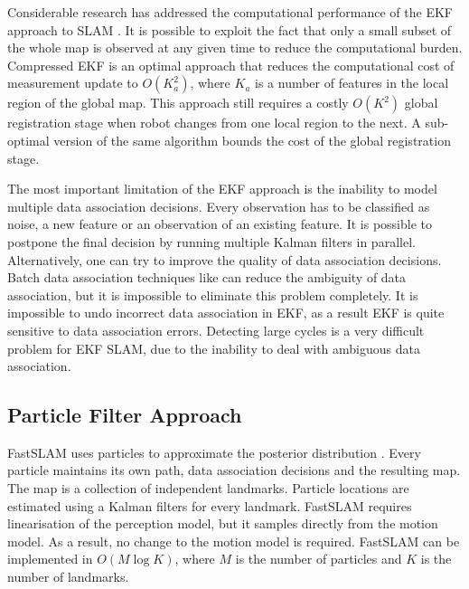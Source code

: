 Considerable research has addressed the computational performance of
the EKF approach to SLAM \cite{williams:acra2001, williams2001esa,
  knight2001tct, guivant01, tim_bailey, uhlmann97nondivergent,
  tardos02:_mappin_local_indoor_envir_using_sonar_data}.  It is
possible to exploit the fact that only a small subset of the whole map
is observed at any given time to reduce the computational burden.
Compressed EKF \cite{williams:acra2001} is an optimal approach that
reduces the computational cost of measurement update to $O(K_a^2)$,
where $K_a$ is a number of features in the local region of the global
map.  This approach still requires a costly $O(K^2)$ global
registration stage when robot changes from one local region to the
next. A sub-optimal version of the same algorithm bounds the cost of the
global registration stage.


The most important limitation of the EKF approach is the inability to
model multiple data association decisions. Every observation has to be
classified as noise, a new feature or an observation of an existing
feature.  It is possible to postpone the final decision by running
multiple Kalman filters in parallel. Alternatively, one can try to
improve the quality of data association decisions. Batch data
association techniques like
\cite{neira01:_data_assoc_stoch_mappin_using,
tardos02:_mappin_local_indoor_envir_using_sonar_data} can reduce the
ambiguity of data association, but it is impossible to eliminate this
problem completely. It is impossible to undo incorrect data association
in EKF, as a result EKF is quite sensitive to data association
errors. Detecting large cycles is a very difficult problem for EKF SLAM,
due to the inability to deal with ambiguous data association.


\subsection{Particle Filter Approach}
FastSLAM uses particles to approximate the posterior distribution
\cite{fastslam}. Every particle maintains its own path, data
association decisions and the resulting map. The map is a collection
of independent landmarks. Particle locations are estimated using a
Kalman filters for every landmark. FastSLAM requires linearisation of
the perception model, but it samples directly from the motion model.
As a result, no change to the motion model is required. FastSLAM can
be implemented in $O(M\log K)$, where $M$ is the number of particles
and $K$ is the number of landmarks.

